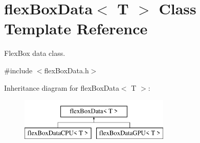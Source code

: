 \hypertarget{classflex_box_data}{}\section{flex\+Box\+Data$<$ T $>$ Class Template Reference}
\label{classflex_box_data}


Flex\+Box data class.  




{\ttfamily \#include $<$flex\+Box\+Data.\+h$>$}

Inheritance diagram for flex\+Box\+Data$<$ T $>$\+:\begin{figure}[H]
\begin{center}
\leavevmode
\includegraphics[height=2.000000cm]{classflex_box_data}
\end{center}
\end{figure}
